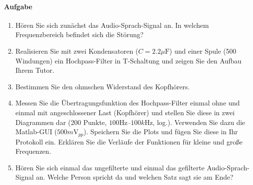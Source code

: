\documentclass[10pt]{scrreprt}
\begin{document}
    \paragraph{Aufgabe}
    \begin{enumerate}
        \item Hören Sie sich zunächst das Audio-Sprach-Signal an. In welchem Frequenzbereich
            befindet sich die Störung?
        \item Realisieren Sie mit zwei Kondensatoren ($C = 2.2 \si{\mu\farad}$) und einer Spule (500 Windungen)
            ein Hochpass-Filter in T-Schaltung und zeigen Sie den Aufbau Ihrem Tutor.
        \item Bestimmen Sie den ohmschen Widerstand des Kopfhörers.
        \item Messen Sie die Übertragungsfunktion des Hochpass-Filter einmal ohne und einmal
            mit angeschlossener Last (Kopfhörer) und stellen Sie diese in zwei Diagrammen
            dar (200 Punkte, $100\si{\hertz}$–$100\si{k\hertz}$, log.). Verwenden Sie dazu die Matlab-GUI
            ($500\si{m\volt}_{pp}$). Speichern Sie die Plots und fügen Sie diese in Ihr Protokoll ein. Erklären
            Sie die Verläufe der Funktionen für kleine und große Frequenzen.
        \item Hören Sie sich einmal das ungefilterte und einmal das gefilterte Audio-Sprach-Signal
            an. Welche Person spricht da und welchen Satz sagt sie am Ende?
    \end{enumerate}
\end{document}
